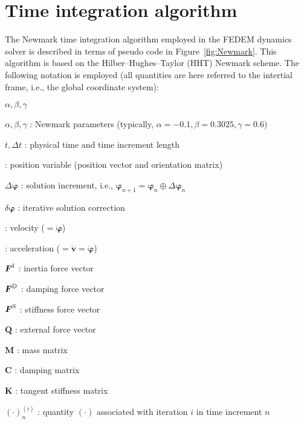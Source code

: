 %
%

%
%

\def\nm1{{n-1}}
\def\np1{{n+1}}
\def\npa{{n+\alpha}}

\chapter{Time integration algorithm}
\label{chap:Newmark-flowchart}

The Newmark time integration algorithm employed in the FEDEM dynamics solver
is described in terms of pseudo code in Figure~\ref{fig:Newmark}.
This algorithm is based on the Hilber--Hughes--Taylor (HHT) Newmark scheme.
The following notation is employed (all quantities are here referred to the
intertial frame, i.e., the global coordinate system):
%
\begin{namelist}{$\alpha,\beta,\gamma$}
\item[$\alpha,\beta,\gamma$] : Newmark parameters (typically,
$\alpha=-0.1, \beta=0.3025, \gamma=0.6$)
\item[$t, \Delta t$] : physical time and time increment length
\item[\bm{\varphi}] : position variable (position vector and orientation matrix)
\item[$\Delta\bm{\varphi}$] : solution increment, i.e.,
 $\bm{\varphi}_\np1 = \bm{\varphi}_n \oplus \Delta\bm{\varphi}_n$
\item[$\delta\bm{\varphi}$] : iterative solution correction
\item[\bm{v}] : velocity ($=\dot{\bm{\varphi}}$)
\item[\bm{a}] : acceleration ($=\dot{\bm{v}}=\ddot{\bm{\varphi}}$)
\item[$\mbox{\boldmath $F$}^{\rm I}$] : inertia force vector
\item[$\mbox{\boldmath $F$}^{\rm D}$] : damping force vector
\item[$\mbox{\boldmath $F$}^{\rm S}$] : stiffness force vector
\item[$\bm{Q}$] : external force vector
\item[$\bm{M}$] : mass matrix
\item[$\bm{C}$] : damping matrix
\item[$\bm{K}$] : tangent stiffness matrix
\item[$(\cdot)_n^{(i)}$] : quantity $(\cdot)$ associated with iteration $i$
in time increment $n$
\end{namelist}

